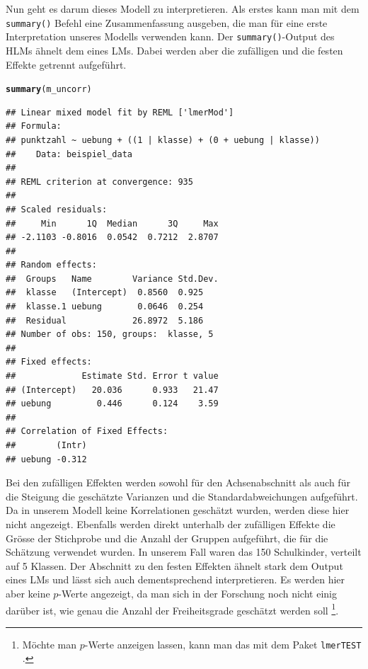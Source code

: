 \documentclass[12pt]{article}\usepackage[]{graphicx}\usepackage[]{color}
\makeatletter
\newcommand{\hlstd}[1]{\textcolor[rgb]{0.345,0.345,0.345}{#1}}%
\newcommand{\hlkwd}[1]{\textcolor[rgb]{0.737,0.353,0.396}{\textbf{#1}}}%
\newenvironment{kframe}{%
 \def\at@end@of@kframe{}%
 \ifinner\ifhmode%
  \def\at@end@of@kframe{\end{minipage}}%
  \begin{minipage}{\columnwidth}%
 \fi\fi%
 \def\FrameCommand##1{\hskip\@totalleftmargin \hskip-\fboxsep
 \colorbox{shadecolor}{##1}\hskip-\fboxsep
     \hskip-\linewidth \hskip-\@totalleftmargin \hskip\columnwidth}%
 \MakeFramed {\advance\hsize-\width
   \@totalleftmargin\z@ \linewidth\hsize
   \@setminipage}}%
 {\par\unskip\endMakeFramed%
 \at@end@of@kframe}
\newenvironment{knitrout}{}{} %
\makeatother
\begin{document}
Nun geht es darum dieses Modell zu interpretieren. Als erstes kann man mit dem \texttt{summary()} Befehl eine Zusammenfassung ausgeben, die man für eine erste Interpretation unseres Modells verwenden kann. Der \texttt{summary()}-Output des HLMs ähnelt dem eines LMs. Dabei werden aber die zufälligen und die festen Effekte getrennt aufgeführt. 

\singlespacing
\begin{knitrout}
\color{fgcolor}\begin{kframe}
\begin{alltt}
\hlkwd{summary}\hlstd{(m_uncorr)}
\end{alltt}
\begin{verbatim}
## Linear mixed model fit by REML ['lmerMod']
## Formula: 
## punktzahl ~ uebung + ((1 | klasse) + (0 + uebung | klasse))
##    Data: beispiel_data
## 
## REML criterion at convergence: 935
## 
## Scaled residuals: 
##     Min      1Q  Median      3Q     Max 
## -2.1103 -0.8016  0.0542  0.7212  2.8707 
## 
## Random effects:
##  Groups   Name        Variance Std.Dev.
##  klasse   (Intercept)  0.8560  0.925   
##  klasse.1 uebung       0.0646  0.254   
##  Residual             26.8972  5.186   
## Number of obs: 150, groups:  klasse, 5
## 
## Fixed effects:
##             Estimate Std. Error t value
## (Intercept)   20.036      0.933   21.47
## uebung         0.446      0.124    3.59
## 
## Correlation of Fixed Effects:
##        (Intr)
## uebung -0.312
\end{verbatim}
\end{kframe}
\end{knitrout}


Bei den zufälligen Effekten werden sowohl für den Achsenabschnitt als auch für die Steigung die geschätzte Varianzen und die Standardabweichungen aufgeführt. Da in unserem Modell keine Korrelationen geschätzt wurden, werden diese hier nicht angezeigt. Ebenfalls werden direkt unterhalb der zufälligen Effekte die Grösse der Stichprobe und die Anzahl der Gruppen aufgeführt, die für die Schätzung verwendet wurden. In unserem Fall waren das 150 Schulkinder, verteilt auf 5 Klassen. Der Abschnitt zu den festen Effekten ähnelt stark dem Output eines LMs und lässt sich auch dementsprechend interpretieren. Es werden hier aber keine $p$-Werte angezeigt, da man sich in der Forschung noch nicht einig darüber ist, wie genau die Anzahl der Freiheitsgrade geschätzt werden soll \citep{PEUGH201085,SnijdersTomA.B2012Ma:a}\footnote{Möchte man $p$-Werte anzeigen lassen, kann man das mit dem Paket \texttt{lmerTEST} \citep{lmertest}.}. 
\end{document}
